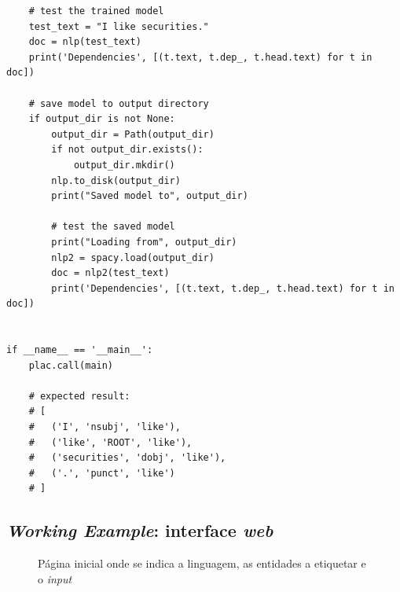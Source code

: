 \documentclass[12pt]{article}
\begin{document}
\begin{verbatim}
    # test the trained model
    test_text = "I like securities."
    doc = nlp(test_text)
    print('Dependencies', [(t.text, t.dep_, t.head.text) for t in doc])

    # save model to output directory
    if output_dir is not None:
        output_dir = Path(output_dir)
        if not output_dir.exists():
            output_dir.mkdir()
        nlp.to_disk(output_dir)
        print("Saved model to", output_dir)

        # test the saved model
        print("Loading from", output_dir)
        nlp2 = spacy.load(output_dir)
        doc = nlp2(test_text)
        print('Dependencies', [(t.text, t.dep_, t.head.text) for t in doc])


if __name__ == '__main__':
    plac.call(main)

    # expected result:
    # [
    #   ('I', 'nsubj', 'like'),
    #   ('like', 'ROOT', 'like'),
    #   ('securities', 'dobj', 'like'),
    #   ('.', 'punct', 'like')
    # ]
\end{verbatim}

\newpage

\subsection{\textit{Working Example}: interface \textit{web}}
\label{anexo:working_example_web}

\begin{figure}[!ht]
	\centering
	\setlength{\abovecaptionskip}{-.4cm}
	\caption{Página inicial onde se indica a linguagem, as entidades a etiquetar e o \textit{input}}
\end{figure}
\end{document}
